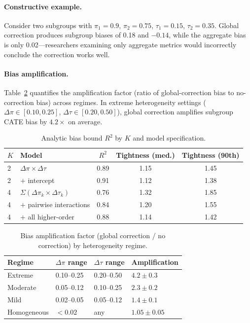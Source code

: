 \documentclass[11pt,a4paper]{article}
\begin{document}
\paragraph{Constructive example.}
Consider two subgroups with $\pi_1 = 0.9$, $\pi_2 = 0.75$, $\tau_1 = 0.15$, $\tau_2 = 0.35$.
Global correction produces subgroup biases of 0.18 and $-0.14$, while the aggregate bias is only 0.02---researchers examining only aggregate metrics would incorrectly conclude the correction works well.

\paragraph{Bias amplification.}
Table~\ref{tab:amplification} quantifies the amplification factor (ratio of global-correction bias to no-correction bias) across regimes.
In extreme heterogeneity settings ($\Delta\pi \in [0.10, 0.25]$, $\Delta\tau \in [0.20, 0.50]$), global correction amplifies subgroup CATE bias by $4.2\times$ on average.

\begin{table}[t]
\centering
\small
\caption{Analytic bias bound $R^2$ by $K$ and model specification.}
\label{tab:bias_bound}
\begin{tabular}{llccc}
\toprule
$K$ & Model & $R^2$ & Tightness (med.) & Tightness (90th) \\
\midrule
2 & $\Delta\pi \times \Delta\tau$ & 0.89 & 1.15 & 1.45 \\
2 & $+ $ intercept & 0.91 & 1.12 & 1.38 \\
4 & $\Sigma(\Delta\pi_k \times \Delta\tau_k)$ & 0.76 & 1.32 & 1.85 \\
4 & $+$ pairwise interactions & 0.84 & 1.20 & 1.55 \\
4 & $+$ all higher-order & 0.88 & 1.14 & 1.42 \\
\bottomrule
\end{tabular}
\end{table}

\begin{table}[t]
\centering
\small
\caption{Bias amplification factor (global correction / no correction) by heterogeneity regime.}
\label{tab:amplification}
\begin{tabular}{llll}
\toprule
Regime & $\Delta\pi$ range & $\Delta\tau$ range & Amplification \\
\midrule
Extreme & 0.10--0.25 & 0.20--0.50 & $4.2 \pm 0.3$ \\
Moderate & 0.05--0.12 & 0.10--0.25 & $2.3 \pm 0.2$ \\
Mild & 0.02--0.05 & 0.05--0.12 & $1.4 \pm 0.1$ \\
Homogeneous & $< 0.02$ & any & $1.05 \pm 0.05$ \\
\bottomrule
\end{tabular}
\end{table}
\end{document}
